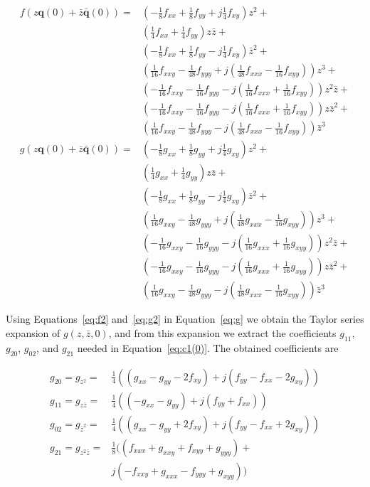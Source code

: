 \documentclass{article}
\theoremstyle{lemma}
\begin{document}
\begin{align}
f(z\mathbf{q}(0)+\bar{z}\mathbf{\bar{q}}(0))=&(-\frac{1}{8}f_{xx}+\frac{1}{8}f_{yy}+j\frac{1}{4}f_{xy})z^2+\nonumber\\
&(\frac{1}{4}f_{xx}+\frac{1}{4}f_{yy})z\bar{z}+\nonumber\\
&(-\frac{1}{8}f_{xx}+\frac{1}{8}f_{yy}-j\frac{1}{4}f_{xy})\bar{z}^2+\nonumber\\
&(\frac{1}{16}f_{xxy}-\frac{1}{48}f_{yyy}+j(\frac{1}{48}f_{xxx}-\frac{1}{16}f_{xyy}))z^3+\nonumber\\
&(-\frac{1}{16}f_{xxy}-\frac{1}{16}f_{yyy}-j(\frac{1}{16}f_{xxx}+\frac{1}{16}f_{xyy}))z^2\bar{z}+\nonumber\\
&(-\frac{1}{16}f_{xxy}-\frac{1}{16}f_{yyy}-j(\frac{1}{16}f_{xxx}+\frac{1}{16}f_{xyy}))z\bar{z}^2+\nonumber\\
&(\frac{1}{16}f_{xxy}-\frac{1}{48}f_{yyy}-j(\frac{1}{48}f_{xxx}-\frac{1}{16}f_{xyy}))\bar{z}^3\label{eq:f2}\\
g(z\mathbf{q}(0)+\bar{z}\mathbf{\bar{q}}(0))=&(-\frac{1}{8}g_{xx}+\frac{1}{8}g_{yy}+j\frac{1}{4}g_{xy})z^2+\nonumber\\
&(\frac{1}{4}g_{xx}+\frac{1}{4}g_{yy})z\bar{z}+\nonumber\\
&(-\frac{1}{8}g_{xx}+\frac{1}{8}g_{yy}-j\frac{1}{4}g_{xy})\bar{z}^2+\nonumber\\
&(\frac{1}{16}g_{xxy}-\frac{1}{48}g_{yyy}+j(\frac{1}{48}g_{xxx}-\frac{1}{16}g_{xyy}))z^3+\nonumber\\
&(-\frac{1}{16}g_{xxy}-\frac{1}{16}g_{yyy}-j(\frac{1}{16}g_{xxx}+\frac{1}{16}g_{xyy}))z^2\bar{z}+\nonumber\\
&(-\frac{1}{16}g_{xxy}-\frac{1}{16}g_{yyy}-j(\frac{1}{16}g_{xxx}+\frac{1}{16}g_{xyy}))z\bar{z}^2+\nonumber\\
&(\frac{1}{16}g_{xxy}-\frac{1}{48}g_{yyy}-j(\frac{1}{48}g_{xxx}-\frac{1}{16}g_{xyy}))\bar{z}^3\label{eq:g2}
\end{align}

Using Equations~\ref{eq:f2} and~\ref{eq:g2} in Equation~\ref{eq:g} we obtain
the Taylor series expansion of $g(z,\bar{z},0)$, and from this expansion we
extract the coefficients $g_{11}$, $g_{20}$, $g_{02}$, and $g_{21}$ needed in
Equation~\ref{eq:c1(0)}. The obtained coefficients are

\begin{align}
g_{20}=g_{z^2}=&\frac{1}{4}((g_{xx}-g_{yy}-2f_{xy})+j(f_{yy}-f_{xx}-2g_{xy}))\label{eq:g20}\\
g_{11}=g_{z\bar{z}}=&\frac{1}{4}((-g_{xx}-g_{yy})+j(f_{yy}+f_{xx}))\label{eq:g11}\\
g_{02}=g_{\bar{z}^2}=&\frac{1}{4}((g_{xx}-g_{yy}+2f_{xy})+j(f_{yy}-f_{xx}+2g_{xy}))\label{eq:g02}\\
g_{21}=g_{z^2\bar{z}}=&\frac{1}{8}((f_{xxx}+g_{xxy}+f_{xyy}+g_{yyy})+\nonumber\\
&j(-f_{xxy}+g_{xxx}-f_{yyy}+g_{xyy}))\label{eq:g21}
\end{align}
\end{document}
